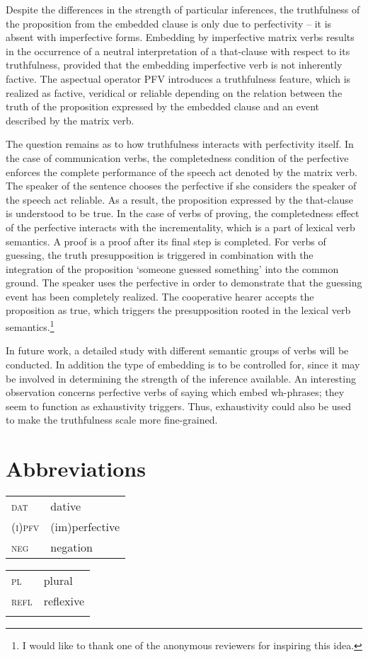 \documentclass[output=paper,
  modfonts,
  newtxmath,
  hidelinks
		  ]{langscibook}
\begin{document}
Despite the differences in the strength of particular inferences, the truthfulness of the proposition from the embedded clause is only due to perfectivity – it is absent with imperfective forms. Embedding by imperfective matrix verbs results in the occurrence of a neutral interpretation of a that-clause with respect to its truthfulness, provided that the embedding imperfective verb is not inherently factive. The aspectual operator PFV introduces a truthfulness feature, which is realized as factive, veridical or reliable depending on the relation between the truth of the proposition expressed by the embedded clause and an event described by the matrix verb.

The question remains as to how truthfulness interacts with perfectivity itself. In the case of communication verbs, the completedness condition of the perfective enforces the complete performance of the speech act denoted by the matrix verb. The speaker of the sentence chooses the perfective if she considers the speaker of the speech act reliable. As a result, the proposition expressed by the that-clause is understood to be true. In the case of verbs of proving, the completedness effect of the perfective interacts with the incrementality, which is a part of lexical verb semantics. A proof is a proof after its final step is completed. For verbs of guessing, the truth presupposition is triggered in combination with the integration of the proposition `someone guessed something' into the common ground. The speaker uses the perfective in order to demonstrate that the guessing event has been completely realized. The cooperative hearer accepts the proposition as true, which triggers the presupposition rooted in the lexical verb semantics.\footnote{I would like to thank one of the anonymous reviewers for inspiring this idea.}

In future work, a detailed study with different semantic groups of verbs will be conducted. In addition the type of embedding is to be controlled for, since it may be involved in determining the strength of the inference available. An interesting observation concerns perfective verbs of saying which embed wh-phrases; they seem to function as exhaustivity triggers. Thus, exhaustivity could also be used to make the truthfulness scale more fine-grained.
 




\section*{Abbreviations}
\begin{tabularx}{.5\textwidth}{@{}lQ@{}}
\textsc{dat} & dative \\
\textsc{(i)pfv} & (im)perfective\\
\textsc{neg} & negation\\
\end{tabularx}%
\begin{tabularx}{.5\textwidth}{@{}lQ@{}}
\textsc{pl}&plural\\
\textsc{refl}&reflexive\\
{}&{}\\
\end{tabularx}
\end{document}
